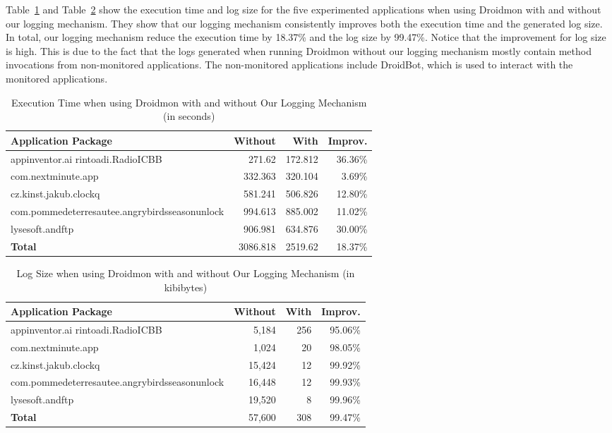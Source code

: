 \documentclass[12pt]{article}
\begin{document}
\pagebreak

Table~\ref{tab:execution-time} and Table~\ref{tab:log-size} show the execution time and log size for the five experimented applications when using Droidmon with and without our logging mechanism. They show that our logging mechanism consistently improves both the execution time and the generated log size. In total, our logging mechanism reduce the execution time by 18.37\% and the log size by 99.47\%.  Notice that the improvement for log size is high. This is due to the fact that the logs generated when running Droidmon without our logging mechanism mostly contain method invocations from non-monitored applications. The non-monitored applications include DroidBot, which is used to interact with the monitored applications. 


\begin {table}[t]
\captionsetup{justification=centering,margin=0cm}
\caption {Execution Time when using Droidmon with and without Our Logging Mechanism (in seconds)}\label{tab:execution-time}
\begin{center}
	\footnotesize
	\begin{tabular}{lrrr} 
		{\bf Application Package} & {\bf Without}  & {\bf With} & {\bf Improv.}\\ 
		\hline
		appinventor.ai rintoadi.RadioICBB & 271.62 & 172.812 & 36.36\% \\
		com.nextminute.app &  332.363 & 320.104 & 3.69\% \\
		cz.kinst.jakub.clockq & 581.241 &  506.826 & 12.80\%\\
		com.pommedeterresautee.angrybirdsseasonunlock & 994.613 & 885.002 & 11.02\% \\
		lysesoft.andftp & 906.981 &  634.876 & 30.00\%\\
		\hline
		{\bf Total} & 3086.818 &	2519.62	 & 18.37\%\\
		\hline
	\end{tabular}
\end{center}
\end{table}

\begin {table}[t]
\captionsetup{justification=centering,margin=0cm}
\caption {Log Size when using Droidmon with and without Our Logging Mechanism (in kibibytes)}\label{tab:log-size}
\begin{center}
	\footnotesize
	\begin{tabular}{lrrr} 
		{\bf Application Package} & {\bf Without}  & {\bf With} & {\bf Improv.}\\ 
		\hline
		appinventor.ai rintoadi.RadioICBB & 5,184 & 256 & 95.06\%\\
		com.nextminute.app & 1,024 & 20 & 98.05\%\\
		cz.kinst.jakub.clockq & 15,424 & 12  & 99.92\%\\
		com.pommedeterresautee.angrybirdsseasonunlock & 16,448 & 12 & 99.93\%\\
		lysesoft.andftp & 19,520 &  8 & 99.96\%\\
		\hline
		{\bf Total} &57,600 &	308	&99.47\%\\
		\hline
	\end{tabular}
\end{center}
\end{table}

\pagebreak



\end{document}
